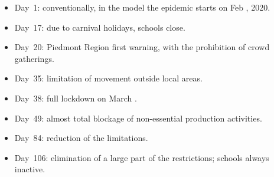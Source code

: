 \documentclass[11pt]{article}
\begin{document}
\begin{itemize}
\setlength{\itemsep}{0pt}

\item Day~1: conventionally, in the model the epidemic starts on Feb , 2020.

\item Day~17: due to carnival holidays, schools close.

\item Day~20: Piedmont Region first warning, with the prohibition of crowd gatherings.

\item Day~35: limitation of movement outside local areas.

\item Day~38: full lockdown on March .

\item Day~49: almost total blockage of non-essential production activities.

\item Day~84: reduction of the limitations.

\item Day~106: elimination of a large part of the restrictions; schools always inactive.

\end{itemize}



\end{document}
